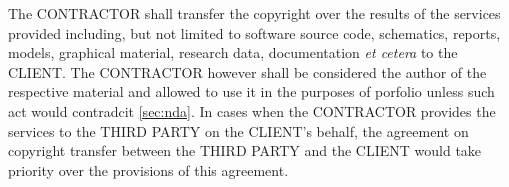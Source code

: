 \documentclass[a4paper]{article}
\newcommand\smartref[2]{\hyperref[#1]{#2\ref{#1}}}
\begin{document}
\begin{Form}
\begin{paracol}{3}
        {The CONTRACTOR shall transfer the copyright over the results of the services provided including, but not limited to software source code, schematics, reports, models, graphical material, research data, documentation \emph{et cetera} to the CLIENT. The CONTRACTOR however shall be considered the author of the respective material and allowed to use it in the purposes of porfolio unless such act would contradcit \smartref{sec:nda}{}. In cases when the CONTRACTOR provides the services to the THIRD PARTY on the CLIENT's behalf, the agreement on copyright transfer between the THIRD PARTY and the CLIENT would take priority over the provisions of this agreement.}
        {}
    \end{paracol}
  \appendix
  
  
  
  \end{Form}
\end{document}
